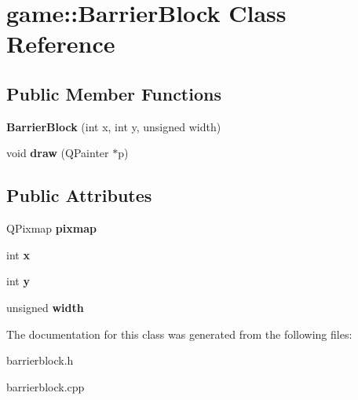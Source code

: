 \hypertarget{classgame_1_1BarrierBlock}{}\section{game\+:\+:Barrier\+Block Class Reference}
\label{classgame_1_1BarrierBlock}
\subsection*{Public Member Functions}
\begin{DoxyCompactItemize}
\item 
\mbox{\label{classgame_1_1BarrierBlock_af749e56fdf63f5a7230dd6f2c8e9bd9b}} 
{\bfseries Barrier\+Block} (int x, int y, unsigned width)
\item 
\mbox{\label{classgame_1_1BarrierBlock_af249f2c03b00f7b32a29ee98587b2e31}} 
void {\bfseries draw} (Q\+Painter $\ast$p)
\end{DoxyCompactItemize}
\subsection*{Public Attributes}
\begin{DoxyCompactItemize}
\item 
\mbox{\label{classgame_1_1BarrierBlock_adcd1902f615bcce1c2fb1dbff5e00192}} 
Q\+Pixmap {\bfseries pixmap}
\item 
\mbox{\label{classgame_1_1BarrierBlock_ae553ded7734278dfbc5a9691a81778a3}} 
int {\bfseries x}
\item 
\mbox{\label{classgame_1_1BarrierBlock_a341be367efd9d1617eee8c312baa9ff4}} 
int {\bfseries y}
\item 
\mbox{\label{classgame_1_1BarrierBlock_a0fd20d6c716099bae772dddf3a05aac7}} 
unsigned {\bfseries width}
\end{DoxyCompactItemize}


The documentation for this class was generated from the following files\+:\begin{DoxyCompactItemize}
\item 
barrierblock.\+h\item 
barrierblock.\+cpp\end{DoxyCompactItemize}
